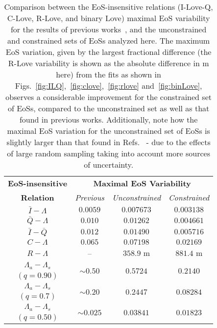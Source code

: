 \documentclass[prd,twocolumn,nofootinbib,superscriptaddress,amsmath,amssymb]{revtex4-1}
\begin{document}
\begin{table}
\centering
\caption{
Comparison between the EoS-insensitive relations (I-Love-Q, C-Love, R-Love, and binary Love) maximal EoS variability for the results of previous works~\cite{Yagi:ILQ,Yagi:binLove}, and the unconstrained and constrained sets of EoSs analyzed here. 
The maximum EoS variation, given by the largest fractional difference (the R-Love variability is shown as the absolute difference in m here) from the fits as shown in Figs.~\ref{fig:ILQ},~\ref{fig:clove},~\ref{fig:rlove} and~\ref{fig:binLove}, observes a considerable improvement for the constrained set of EoSs, compared to the unconstrained set as well as that found in previous works.
Additionally, note how the maximal EoS variation for the unconstrained set of EoSs is slightly larger than that found in Refs.~\cite{Yagi:ILQ,Yagi:binLove} - due to the effects of large random sampling taking into account more sources of uncertainty.
}\label{tab:maxVar}
\begin{tabular}{ c  || c c c } 
 \hline
 \hline
 \textbf{EoS-insensitive} & \multicolumn{3}{c}{\textbf{Maximal EoS Variability}} \\
 \cline{2-4}
 \textbf{Relation} & \multicolumn{1}{c|}{\emph{Previous}} & \multicolumn{1}{c|}{\emph{Unconstrained}} & \emph{Constrained}\\
 \hline
 $\bar{I}-\Lambda$ &  $0.0059$ & $0.007673$ & $0.003138$\\
 $\bar{Q}-\Lambda$ & $0.010$ & $0.01262$ & $0.004661$\\
 $\bar{I}-\bar{Q}$ & $0.012$ & $0.01490$ & $0.005716$\\
 \hline
 $C-\Lambda$ & $0.065$ & $0.07198$ & $0.02169$\\
 $R-\Lambda$ & -- & $358.9 \text{ m}$ & $881.4 \text{ m}$\\
 \hline
 $\Lambda_a-\Lambda_s$ & \multirow{2}{*}{$\sim0.50$} & \multirow{2}{*}{$0.5724$} & \multirow{2}{*}{$0.2140$}\\
 $(q=0.90)$ & & &\\
 \cline{1-1}
 $\Lambda_a-\Lambda_s$ & \multirow{2}{*}{$\sim0.20$} & \multirow{2}{*}{$0.2447$} & \multirow{2}{*}{$0.08284$}\\
  $(q=0.7)$ & & &\\
  \cline{1-1}
 $\Lambda_a-\Lambda_s$ & \multirow{2}{*}{$\sim0.025$} & \multirow{2}{*}{$0.03841$} & \multirow{2}{*}{$0.01823$}\\
  $(q=0.50)$ & & &\\
  \cline{1-1}
\hline
\hline
\end{tabular}
\end{table}
\end{document}
